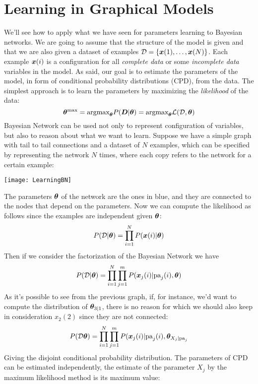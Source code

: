 \section{Learning in Graphical Models}
We'll see how to apply what we have seen for parameters learning to Bayesian networks. \newline
We are going to assume that the structure of the model is given and that we are also given a dataset of examples $\mathcal{D}=\{\bm{x}(1),\hdots,\bm{x}(N)\}$. Each example $\bm{x}(i)$ is a configuration for all \textit{complete data} or some \textit{incomplete data} variables in the model. \newline
As said, our goal is to estimate the parameters of the model, in form of conditional probability distributions (CPD), from the data. 
The simplest approach is to learn the parameters by maximizing the \textit{likelihood} of the data:
\[\bm{\theta}^{\text{max}}=\text{argmax}_{\bm{\theta}}P(\bm{D}\vert\bm{\theta})=\text{argmax}_{\bm{\theta}}\mathcal{L}(\mathcal{D},\bm{\theta})\]
Bayesian Network can be used not only to represent configuration of variables, but also to reason about what we want to learn. Suppose we have a simple graph with tail to tail connections and a dataset of $N$ examples, which can be specified by representing the network $N$ times, where each copy refers to the network for a certain example: 
\begin{center}
  \texttt{[image: LearningBN]}
\end{center}
The parameters $\bm{\theta}$ of the network are the ones in blue, and they are connected to the nodes that depend on the parameters. Now we can compute the likelihood as follows since the examples are independent given $\bm{\theta}$:
\[P(\mathcal{D}\vert \bm{\theta})=\displaystyle\prod_{i=1}^{N}P(\bm{x}(i)\vert\bm{\theta})\]
Then if we consider the factorization of the Bayesian Network we have
\[P(\mathcal{D}\vert\bm{\theta})=\displaystyle\prod_{i=1}^N\displaystyle\prod_{j=1}^mP(\bm{x}_j(i)\vert \text{pa}_j(i),\bm{\theta})\]
As it's possible to see from the previous graph, if, for instance, we'd want to compute the distribution of $\bm{\theta}_{3\vert 1}$, there is no reason for which we should also keep in consideration $x_2(2)$ since they are not connected:
\[P(\mathcal{D}\bm{\theta})=\displaystyle\prod_{i=1}^N\displaystyle\prod_{j=1}^mP(\bm{x}_j(i)\vert \text{pa}_j(i),\bm{\theta}_{X_j\vert\text{pa}_j}\]
Giving the disjoint conditional probability distribution. \newline
The parameters of CPD can be estimated independently, the estimate of the parameter $X_j$ by the maximum likelihood method is its maximum value:
